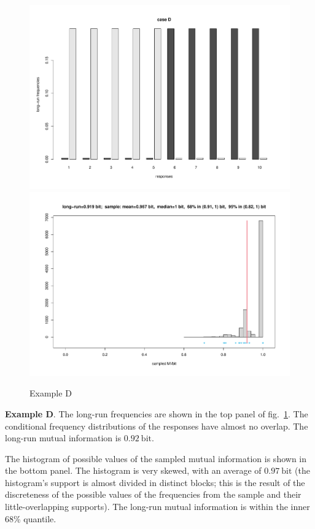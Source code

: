 \documentclass[\ifafour a4paper,12pt,\else a5paper,10pt,\fi%
onecolumn,oneside,article,%
british%
]{memoir}
\theoremstyle{remark}
\theoremstyle{innote}
\renewcommand*{\|}[1][]{\nonscript\,#1\vert\nonscript\;\mathopen{}}
\newcommand*{\fig}{fig.}%
\newcommand*{\bit}{\mathrm{bit}}
\begin{document}
\clearpage

\begin{figure}[p]%
\centering\includegraphics[width=\linewidth]{scripts/resp_caseD.pdf}\\%
\includegraphics[width=\linewidth]{scripts/histo_caseD.pdf}\\
\caption{Example D}\label{fig:resp_caseD}
\end{figure}%
\textbf{Example D}. The long-run frequencies are shown in the top panel of
\fig~\ref{fig:resp_caseD}. The conditional frequency distributions of the
responses have almost no overlap. The long-run mutual information is
$0.92\:\bit$.

The histogram of possible values of the sampled mutual information is shown
in the bottom panel. The histogram is very skewed, with an average of
$0.97\:\bit$ (the histogram's support is almost divided in distinct blocks;
this is the result of the discreteness of the possible values of the
frequencies from the sample and their little-overlapping supports). The
long-run mutual information is within the inner 68\% quantile.
\end{document}
